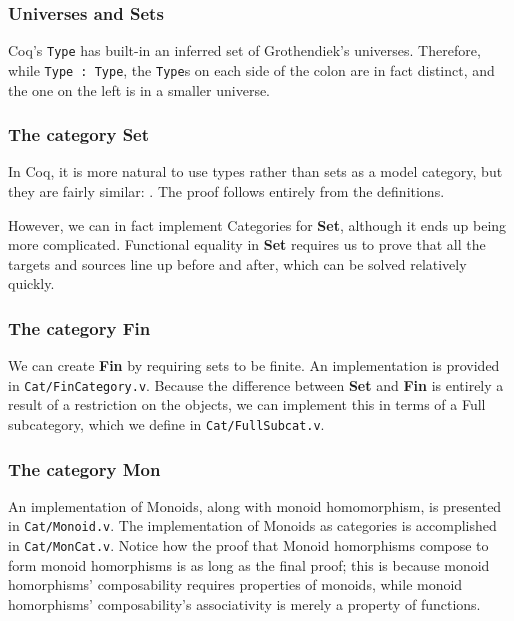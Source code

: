 \documentclass[12pt,twocolumn,oneside]{book}
\begin{document}
\subsubsection{Universes and Sets}

Coq's \texttt{Type} has built-in an inferred set of Grothendiek's universes. Therefore,
while \texttt{Type : Type}, the \texttt{Type}s on each side of the colon are in fact
distinct, and the one on the left is in a smaller universe.

\subsubsection{The category \textbf{Set}}

In Coq, it is more natural to use types rather than sets as a model category, but
they are fairly similar: . The proof follows entirely
from the definitions.

However, we can in fact implement Categories for \textbf{Set}, although it ends
up being more complicated. Functional equality in \textbf{Set} requires us to prove
that all the targets and sources line up before and after, which can be solved relatively
quickly.

\subsubsection{The category \textbf{Fin}}

We can create \textbf{Fin} by requiring sets to be finite. An implementation is
provided in \texttt{Cat/FinCategory.v}. Because the difference between \textbf{Set}
and \textbf{Fin} is entirely a result of a restriction on the objects, we can implement
this in terms of a Full subcategory, which we define in \texttt{Cat/FullSubcat.v}.

\subsubsection{The category \textbf{Mon}}

An implementation of Monoids, along with monoid homomorphism, is presented in
\texttt{Cat/Monoid.v}. The implementation of Monoids as categories is accomplished
in \texttt{Cat/MonCat.v}. Notice how the proof that Monoid homorphisms compose to form
monoid homorphisms is as long as the final proof; this is because monoid homorphisms'
composability requires properties of monoids, while monoid homorphisms' composability's
associativity is merely a property of functions.
\end{document}

